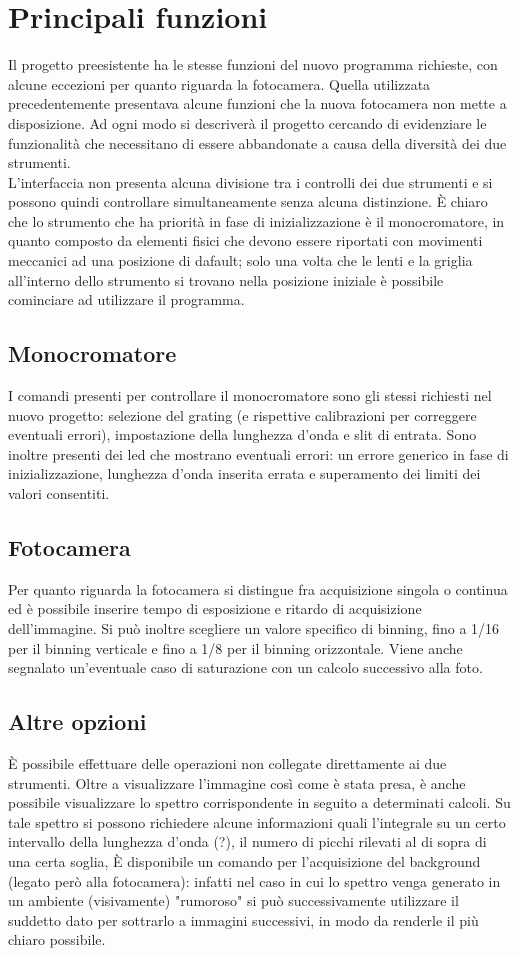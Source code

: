 \section{Principali funzioni}
Il progetto preesistente ha le stesse funzioni del nuovo programma richieste, con alcune eccezioni per quanto riguarda la fotocamera. Quella utilizzata precedentemente presentava alcune funzioni che la nuova fotocamera non mette a disposizione. Ad ogni modo si descriver\`a il progetto cercando di evidenziare le funzionalit\`a che necessitano di essere abbandonate a causa della diversit\`a dei due strumenti.\\
L'interfaccia non presenta alcuna divisione tra i controlli dei due strumenti e si possono quindi controllare simultaneamente senza alcuna distinzione. È chiaro che lo strumento che ha priorità in fase di inizializzazione è il monocromatore, in quanto composto da elementi fisici che devono essere riportati con movimenti meccanici ad una posizione di dafault; solo una volta che le lenti e la griglia all'interno dello strumento si trovano nella posizione iniziale è possibile cominciare ad utilizzare il programma.
\subsection{Monocromatore}
I comandi presenti per controllare il monocromatore sono gli stessi richiesti nel nuovo progetto: selezione del grating (e rispettive calibrazioni per correggere eventuali errori), impostazione della lunghezza d'onda e slit di entrata. Sono inoltre presenti dei led che mostrano eventuali errori: un errore generico in fase di inizializzazione, lunghezza d'onda inserita errata e superamento dei limiti dei valori consentiti.

\subsection{Fotocamera}
Per quanto riguarda la fotocamera si distingue fra acquisizione singola o continua ed è possibile inserire tempo di esposizione e ritardo di acquisizione dell'immagine. Si può inoltre scegliere un valore specifico di binning, fino a 1/16 per il binning verticale e fino a 1/8 per il binning orizzontale. Viene anche segnalato un'eventuale caso di saturazione con un calcolo successivo alla foto.

\subsection{Altre opzioni}
È possibile effettuare delle operazioni non collegate direttamente ai due strumenti. Oltre a visualizzare l'immagine così come è stata presa, è anche possibile visualizzare lo spettro corrispondente in seguito a determinati calcoli. Su tale spettro si possono richiedere alcune informazioni quali l'integrale su un certo intervallo della lunghezza d'onda (?), il numero di picchi rilevati al di sopra di una certa soglia, 
È disponibile un comando per l'acquisizione del background (legato però alla fotocamera): infatti nel caso in cui lo spettro venga generato in un ambiente (visivamente) "rumoroso" si può successivamente utilizzare il suddetto dato per sottrarlo a immagini successivi, in modo da renderle il più chiaro possibile.

